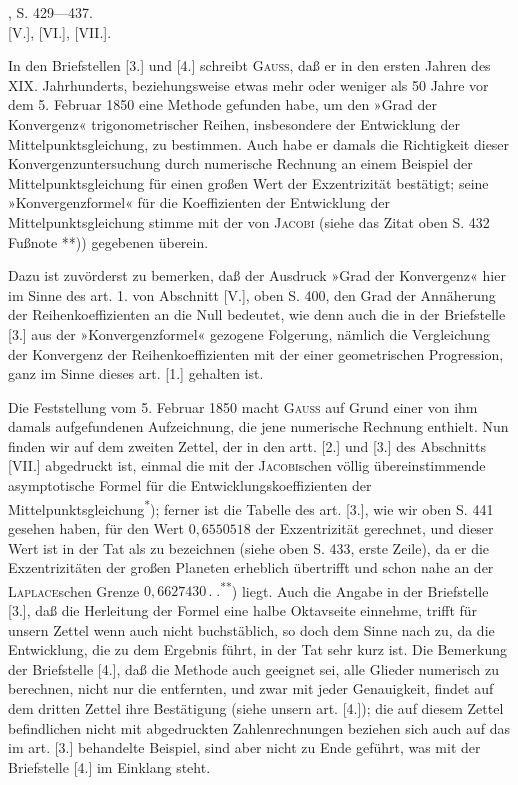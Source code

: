 \par\bigskip\begingroup\small
\begin{center}, S. 429—437.\\
 [V.], [VI.], [VII.].\end{center}
\indent In den Briefstellen [3.] und [4.] schreibt \textsc{Gauss}, daß er in den ersten Jahren des XIX. Jahrhunderts, beziehungsweise etwas mehr oder weniger als 50 Jahre vor dem 5. Februar 1850 eine Methode gefunden habe, um den »Grad der Konvergenz« trigonometrischer Reihen, insbesondere der Entwicklung der Mittelpunktsgleichung, zu bestimmen. Auch habe er damals die Richtigkeit dieser Konvergenzuntersuchung durch numerische Rechnung an einem Beispiel der Mittelpunktsgleichung für einen großen Wert der Exzentrizität bestätigt; seine »Konvergenzformel« für die Koeffizienten der Entwicklung der Mittelpunktsgleichung stimme mit der von \textsc{Jacobi} (siehe das Zitat oben S. 432 Fußnote **)) gegebenen überein.

\indent Dazu ist zuvörderst zu bemerken, daß der Ausdruck »Grad der Konvergenz« hier im Sinne des art. 1. von Abschnitt [V.], oben S. 400, den Grad der Annäherung der Reihenkoeffizienten an die Null bedeutet, wie denn auch die in der Briefstelle [3.] aus der »Konvergenzformel« gezogene Folgerung, nämlich die Vergleichung der Konvergenz der Reihenkoeffizienten mit der einer geometrischen Progression, ganz im Sinne dieses art. [1.] gehalten ist.

\indent Die Feststellung vom 5. Februar 1850 macht \textsc{Gauss} auf Grund einer von ihm damals aufgefundenen Aufzeichnung, die jene numerische Rechnung enthielt. Nun finden wir auf dem zweiten Zettel, der in den artt. [2.] und [3.] des Abschnitts [VII.] abgedruckt ist, einmal die mit der \textsc{Jacobi}schen völlig übereinstimmende
\clearpage{}
\noindent asymptotische Formel für die Entwicklungskoeffizienten der Mittelpunktsgleichung\textsuperscript{*}); ferner ist die Tabelle des art. [3.], wie wir oben S. 441 gesehen haben, für den Wert \(0{,}6550518\) der Exzentrizität gerechnet, und dieser Wert ist in der Tat als  zu bezeichnen (siehe oben S. 433, erste Zeile), da er die Exzentrizitäten der großen Planeten erheblich übertrifft und schon nahe an der \textsc{Laplace}schen Grenze \(0{,}6627430\,{.}\;{.}\)\textsuperscript{**}) liegt. Auch die Angabe in der Briefstelle [3.], daß die Herleitung der Formel eine halbe Oktavseite einnehme, trifft für unsern Zettel wenn auch nicht buchstäblich, so doch dem Sinne nach zu, da die Entwicklung, die zu dem Ergebnis führt, in der Tat sehr kurz ist. Die Bemerkung der Briefstelle [4.], daß die Methode auch geeignet sei, alle Glieder numerisch zu berechnen, nicht nur die entfernten, und zwar mit jeder Genauigkeit, findet auf dem dritten Zettel ihre Bestätigung (siehe unsern art. [4.]); die auf diesem Zettel befindlichen nicht mit abgedruckten Zahlenrechnungen beziehen sich auch auf das im art. [3.] behandelte Beispiel, sind aber nicht zu Ende geführt, was mit der Briefstelle [4.] im Einklang steht.

